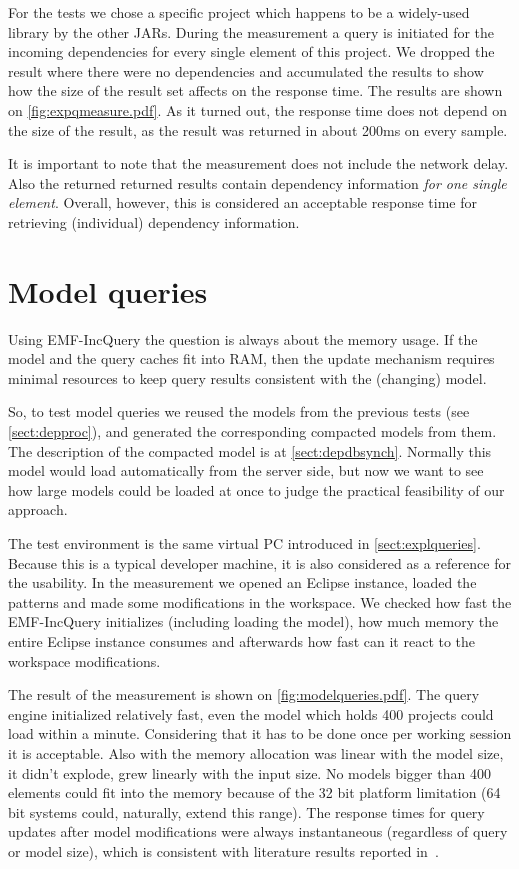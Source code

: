 For the tests we chose a specific project which happens to be a widely-used
library by the other JARs. During the measurement a query is initiated for 
the incoming dependencies for every single element of this project. 
We dropped the result where there were no dependencies and accumulated the
results to show how the size of the result set affects on the response time.
The results are shown on \autoref{fig:expqmeasure.pdf}.
As it turned out, the response time does not depend on the size of the
result, as the result was returned in about 200ms on every sample.

It is important to note that the measurement does not include the network delay.
Also the returned returned results contain dependency information \emph{for one
single element}. Overall, however, this is considered an acceptable response
time for retrieving (individual) dependency information.


\section{Model queries}
Using EMF-IncQuery the question is always about the memory usage. If the model
and the query caches fit into RAM, then the update mechanism requires minimal
resources to keep query results consistent with the (changing) model.

So, to test model queries we reused the models from the previous tests (see
\autoref{sect:depproc}), and generated the corresponding compacted models from
them.
The description of the compacted model is at \autoref{sect:depdbsynch}. Normally
this model would load automatically from the server side, but now we want to see
how large models could be loaded at once to judge the practical feasibility of
our approach.

The test environment is the same virtual PC introduced in
\autoref{sect:explqueries}. Because this is a typical developer machine, it is
also considered as a reference for the usability. In the measurement we opened
an Eclipse instance, loaded the patterns and made some modifications in the
workspace. We checked how fast the EMF-IncQuery initializes (including loading
the model), how much memory the entire Eclipse instance consumes and afterwards
how fast can it react to the workspace modifications.

The result of the measurement is shown on \autoref{fig:modelqueries.pdf}.
The query engine initialized relatively fast, even the model which holds 400
projects could load within a minute. Considering that it has to be done once
per working session it is acceptable. Also with the memory allocation was linear
with the model size, it didn't explode, grew linearly with the input size.
No models bigger than 400 elements could fit into the memory because of the 32
bit platform limitation (64 bit systems could, naturally, extend this range).
The response times for query updates after model modifications were always
instantaneous (regardless of query or model size), which is consistent with
literature results reported in~\cite{MODELS10}.


